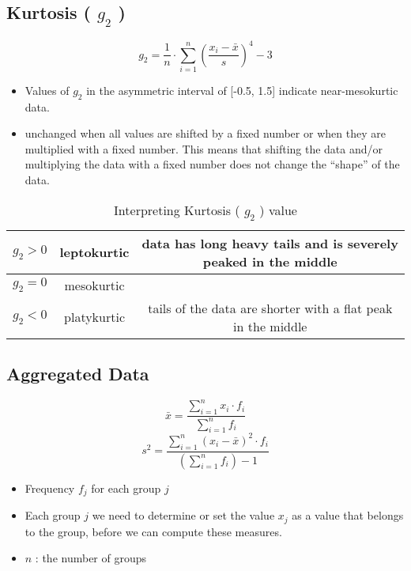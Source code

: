 \subsection{Kurtosis ( $g_2$ ) \cite{ism-1}}\label{Kurtosis}
\[
    g_2 = \displaystyle\dfrac{1}{n} \cdot \sum_{i=1}^{n} \left( \dfrac{x_i - \bar{x}}{s} \right)^4 - 3
\]

\begin{itemize}
    \item Values of $g_2$ in the asymmetric interval of [-0.5, 1.5] indicate near-mesokurtic data.
    \item unchanged when all values are shifted by a fixed number or when they are multiplied with a fixed number. This means that shifting the data and/or multiplying the data with a fixed number does not change the “shape” of the data.
\end{itemize}

\begin{table}
    \centering
    \begin{tabular}{|c|c|c|}
        \hline
        $g_2 > 0$ & leptokurtic & data has long heavy tails and is severely peaked in the middle \\ \hline
        $g_2 = 0$ & mesokurtic & \\ \hline
        $g_2 < 0$ & platykurtic & tails of the data are shorter with a flat peak in the middle \\ \hline
    \end{tabular}
    \caption{Interpreting Kurtosis ( $g_2$ ) value}
\end{table}

\subsection{Aggregated Data \cite{ism-1}}\label{Aggregated Data}
\[
    \bar{x} = \displaystyle\dfrac{\sum_{i=1}^{n} x_i \cdot f_i}{\sum_{i=1}^{n} f_i}
\]
\[
    s^2 = \displaystyle\dfrac{\sum_{i=1}^{n} (x_i - \bar{x})^2 \cdot f_i}{\left( \sum_{i=1}^{n} f_i \right) - 1}
\]

\begin{itemize}
    \item Frequency $f_j$ for each group $j$
    \item Each group $j$ we need to determine or set the value $x_j$ as a value that belongs to the group, before we can compute these measures.
    \item $n$ : the number of groups
\end{itemize}





















